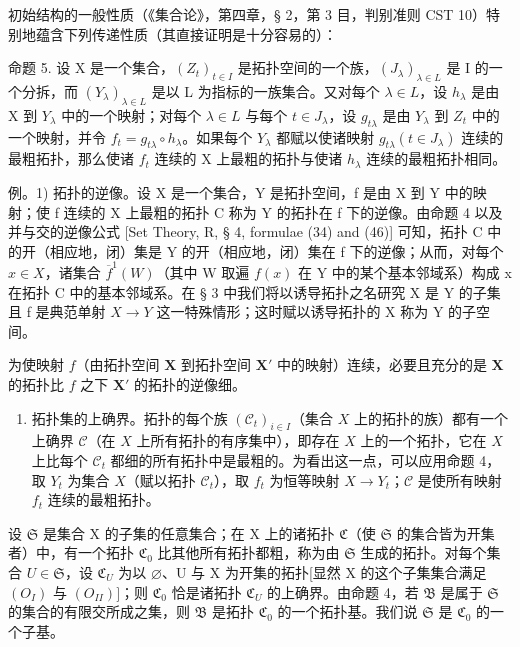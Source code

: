 初始结构的一般性质（《集合论》，第四章，§ 2，第 3 目，判别准则 CST 10）特别地蕴含下列传递性质（其直接证明是十分容易的）：

命题 5. 设 X 是一个集合，\((Z_{t})_{t\in I}\) 是拓扑空间的一个族，\((J_{\lambda})_{\lambda\in L}\) 是 I 的一个分拆，而 \((Y_{\lambda})_{\lambda\in L}\) 是以 L 为指标的一族集合。又对每个 \(\lambda\in L\)，设 \(h_{\lambda}\) 是由 X 到 \(Y_{\lambda}\) 中的一个映射；对每个 \(\lambda\in L\) 与每个 \(t\in J_{\lambda}\)，设 \(g_{t\lambda}\) 是由 \(Y_{\lambda}\) 到 \(Z_{t}\) 中的一个映射，并令 \(f_{t}=g_{t\lambda}\circ h_{\lambda}\)。如果每个 \(Y_{\lambda}\) 都赋以使诸映射 \(g_{t\lambda}(t\in J_{\lambda})\) 连续的最粗拓扑，那么使诸 \(f_{t}\) 连续的 X 上最粗的拓扑与使诸 \(h_{\lambda}\) 连续的最粗拓扑相同。

例。1) 拓扑的逆像。设 X 是一个集合，Y 是拓扑空间，f 是由 X 到 Y 中的映射；使 f 连续的 X 上最粗的拓扑 C 称为 Y 的拓扑在 f 下的逆像。由命题 4 以及并与交的逆像公式 {[}Set Theory, R, § 4, formulae (34) and (46){]} 可知，拓扑 C 中的开（相应地，闭）集是 Y 的开（相应地，闭）集在 f 下的逆像；从而，对每个 \(x \in X\)，诸集合 \(\overline{f}^{1}(W)\)（其中 W 取遍 \(f(x)\) 在 Y 中的某个基本邻域系）构成 x 在拓扑 C 中的基本邻域系。在 § 3 中我们将以诱导拓扑之名研究 X 是 Y 的子集且 f 是典范单射 \(X \to Y\) 这一特殊情形；这时赋以诱导拓扑的 X 称为 Y 的子空间。

为使映射 \(f\)（由拓扑空间 \(\mathbf{X}\) 到拓扑空间 \(\mathbf{X}'\) 中的映射）连续，必要且充分的是 \(\mathbf{X}\) 的拓扑比 \(f\) 之下 \(\mathbf{X}'\) 的拓扑的逆像细。

\begin{enumerate}
\def\labelenumi{\arabic{enumi})}
\setcounter{enumi}{1}
\tightlist
\item
  拓扑集的上确界。拓扑的每个族 \((\mathcal{C}_t)_{i\in I}\)（集合 \(X\) 上的拓扑的族）都有一个上确界 \(\mathcal{C}\)（在 \(X\) 上所有拓扑的有序集中），即存在 \(X\) 上的一个拓扑，它在 \(X\) 上比每个 \(\mathcal{C}_t\) 都细的所有拓扑中是最粗的。为看出这一点，可以应用命题 4，取 \(Y_t\) 为集合 \(X\)（赋以拓扑 \(\mathcal{C}_t\)），取 \(f_t\) 为恒等映射 \(X\to Y_t\)；\(\mathcal{C}\) 是使所有映射 \(f_t\) 连续的最粗拓扑。
\end{enumerate}

设 \(\mathfrak{S}\) 是集合 X 的子集的任意集合；在 X 上的诸拓扑 \(\mathfrak{C}\)（使 \(\mathfrak{S}\) 的集合皆为开集者）中，有一个拓扑 \(\mathfrak{C}_0\) 比其他所有拓扑都粗，称为由 \(\mathfrak{S}\) 生成的拓扑。对每个集合 \(U \in \mathfrak{S}\)，设 \(\mathfrak{C}_U\) 为以 \(\varnothing\)、U 与 X 为开集的拓扑{[}显然 X 的这个子集集合满足 \((O_I)\) 与 \((O_{II})]\)；则 \(\mathfrak{C}_0\) 恰是诸拓扑 \(\mathfrak{C}_U\) 的上确界。由命题 4，若 \(\mathfrak{B}\) 是属于 \(\mathfrak{S}\) 的集合的有限交所成之集，则 \(\mathfrak{B}\) 是拓扑 \(\mathfrak{C}_0\) 的一个拓扑基。我们说 \(\mathfrak{S}\) 是 \(\mathfrak{C}_0\) 的一个子基。

